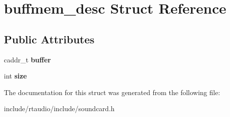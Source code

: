 \hypertarget{structbuffmem__desc}{}\section{buffmem\+\_\+desc Struct Reference}
\label{structbuffmem__desc}
\subsection*{Public Attributes}
\begin{DoxyCompactItemize}
\item 
caddr\+\_\+t {\bfseries buffer}\hypertarget{structbuffmem__desc_a2ab6e54af4a20a5876e3739b67a8cbc3}{}\label{structbuffmem__desc_a2ab6e54af4a20a5876e3739b67a8cbc3}

\item 
int {\bfseries size}\hypertarget{structbuffmem__desc_a6ceb050dc0a047b0fb039b0bb5b46beb}{}\label{structbuffmem__desc_a6ceb050dc0a047b0fb039b0bb5b46beb}

\end{DoxyCompactItemize}


The documentation for this struct was generated from the following file\+:\begin{DoxyCompactItemize}
\item 
include/rtaudio/include/soundcard.\+h\end{DoxyCompactItemize}
